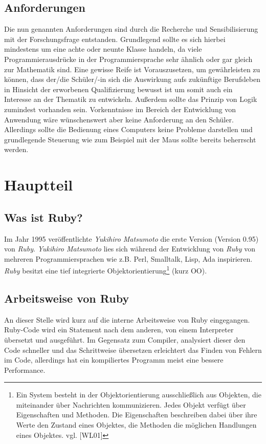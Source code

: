 \documentclass[12pt,DIV=14, version=first, BCOR=10mm,a4paper,twoside,parskip=half-,headsepline,headinclude]{scrartcl}
\begin{document}
\subsection{Anforderungen}
\begin{flushleft}
Die nun genannten Anforderungen sind durch die Recherche und Sensibilisierung mit der Forschungsfrage entstanden. Grundlegend sollte es sich hierbei mindestens um eine achte oder neunte Klasse handeln, da viele Programmierausdrücke in der Programmiersprache sehr ähnlich oder gar gleich zur Mathematik sind. Eine gewisse Reife ist Vorauszusetzen, um gewährleisten zu können, dass der/die Schüler/-in sich die Auswirkung aufs zukünftige Berufsleben in Hinsicht der erworbenen Qualifizierung bewusst ist um somit auch ein Interesse an der Thematik zu entwickeln. Außerdem sollte das Prinzip von Logik zumindest vorhanden sein. Vorkenntnisse im Bereich der Entwicklung von Anwendung wäre wünschenswert aber keine Anforderung an den Schüler. Allerdings sollte die Bedienung eines Computers keine Probleme darstellen und grundlegende Steuerung wie zum Beispiel mit der Maus sollte bereits beherrscht werden.
\end{flushleft}

\section{Hauptteil}

\subsection{Was ist Ruby?} \label{Was ist Ruby?}
\begin{flushleft}
Im Jahr 1995 veröffentlichte \textit{Yukihiro Matsumoto} die erste Version (Version 0.95) von \textit{\glqq Ruby\grqq}. \textit{Yukihiro Matsumoto} lies sich während der Entwicklung von \textit{\glqq Ruby\grqq} von mehreren Programmiersprachen wie z.B. Perl, Smalltalk, Lisp, Ada inspirieren. \textit{Ruby} besitzt eine tief integrierte 
Objektorientierung\footnote{\label{foot:1} Ein System besteht in der Objektorientierung ausschließlich aus Objekten, die miteinander über Nachrichten kommunizieren. Jedes Objekt verfügt über Eigenschaften und Methoden. Die Eigenschaften beschreiben dabei über ihre Werte den Zustand eines Objektes, die Methoden die möglichen Handlungen eines Objektes. vgl. [WL01]} (kurz OO).
\end{flushleft}

\subsection{Arbeitsweise von Ruby}
\begin{flushleft}
An dieser Stelle wird kurz auf die interne Arbeitsweise von Ruby eingegangen. Ruby-Code wird ein Statement nach dem anderen, von einem Interpreter übersetzt und ausgeführt. Im Gegensatz zum Compiler, analysiert dieser den Code schneller und das Schrittweise übersetzen erleichtert das Finden von Fehlern im Code, allerdings hat ein kompiliertes Programm meist eine bessere Performance.
\end{flushleft}
\end{document}
